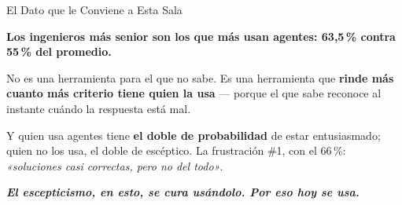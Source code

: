 \documentclass[aspectratio=169, 11pt]{beamer}
\begin{document}
\begin{frame}[shrink=5]{El Dato que le Conviene a Esta Sala}
  \vspace{4pt}
  \begin{tcolorbox}[colback=arcaGray, colframe=codeGreen, boxrule=0pt,
    leftrule=4pt, arc=3pt, left=10pt, right=10pt, top=8pt, bottom=8pt]
    {\large\color{arcaDark}\bfseries
     Los ingenieros \textbf{más senior} son los que \textbf{más} usan
     agentes: 63,5\,\% contra 55\,\% del promedio.}
  \end{tcolorbox}
  \vspace{8pt}
  {\footnotesize\color{textMuted}
   No es una herramienta para el que no sabe. Es una herramienta que
   \textbf{rinde más cuanto más criterio tiene quien la usa} --- porque el
   que sabe reconoce al instante cuándo la respuesta está mal.
   \vspace{6pt}

   Y quien usa agentes tiene \textbf{el doble de probabilidad} de estar
   entusiasmado; quien no los usa, el doble de escéptico. La frustración
   \#1, con el 66\,\%: \emph{«soluciones casi correctas, pero no del todo»}.}
  \vspace{7pt}
  {\footnotesize\color{arcaDark}\bfseries\itshape
   El escepticismo, en esto, se cura usándolo. Por eso hoy se usa.}
\end{frame}
\end{document}
